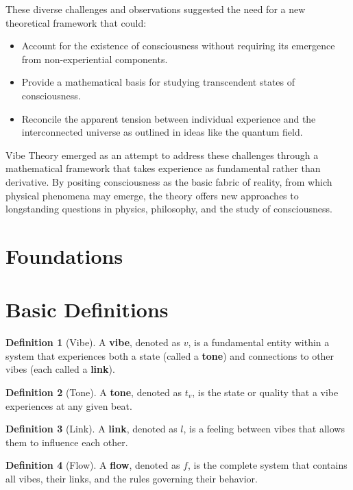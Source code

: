 \documentclass{article}
\theoremstyle{definition}
\theoremstyle{axiom}
\theoremstyle{theorem}
\theoremstyle{lemma}
\theoremstyle{proposition}
\newtheorem{definition}{Definition}      %
\begin{document}
These diverse challenges and observations suggested the need for a new theoretical framework that could:
\begin{itemize}
\item Account for the existence of consciousness without requiring its emergence from non-experiential components.
\item Provide a mathematical basis for studying transcendent states of consciousness.
\item Reconcile the apparent tension between individual experience and the interconnected universe as outlined in ideas like the quantum field.
\end{itemize}

Vibe Theory emerged as an attempt to address these challenges through a mathematical framework that takes experience as fundamental rather than derivative. By positing consciousness as the basic fabric of reality, from which physical phenomena may emerge, the theory offers new approaches to longstanding questions in physics, philosophy, and the study of consciousness.

\section{Foundations}

\section{Basic Definitions}

\begin{definition}[Vibe]
A \textbf{vibe}, denoted as $v$, is a fundamental entity within a system that experiences both a state (called a \textbf{tone}) and connections to other vibes (each called a \textbf{link}).
\end{definition}

\begin{definition}[Tone]
A \textbf{tone}, denoted as $t_v$, is the state or quality that a vibe experiences at any given beat.
\end{definition}

\begin{definition}[Link]
A \textbf{link}, denoted as $l$, is a feeling between vibes that allows them to influence each other.
\end{definition}

\begin{definition}[Flow]
A \textbf{flow}, denoted as $f$, is the complete system that contains all vibes, their links, and the rules governing their behavior.
\end{definition}
\end{document}
